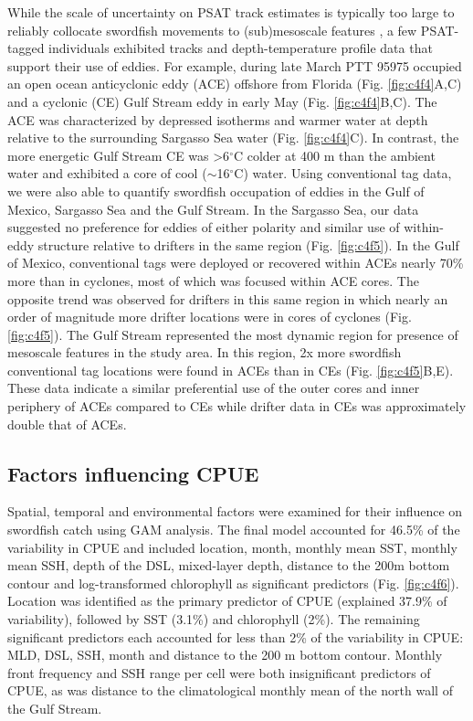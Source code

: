 While the scale of uncertainty on PSAT track estimates is typically too large to reliably collocate swordfish movements to (sub)mesoscale features \citep[$\sim$100 km;][Chp. \ref{chap:2}]{Braun2018a}, a few PSAT-tagged individuals exhibited tracks and depth-temperature profile data that support their use of eddies. For example, during late March PTT 95975 occupied an open ocean anticyclonic eddy (ACE) offshore from Florida (Fig. \ref{fig:c4f4}A,C) and a cyclonic (CE) Gulf Stream eddy in early May (Fig. \ref{fig:c4f4}B,C). The ACE was characterized by depressed isotherms and warmer water at depth relative to the surrounding Sargasso Sea water (Fig. \ref{fig:c4f4}C). In contrast, the more energetic Gulf Stream CE was >6$^{\circ}$C colder at 400 m than the ambient water and exhibited a core of cool ($\sim$16$^{\circ}$C) water. Using conventional tag data, we were also able to quantify swordfish occupation of eddies in the Gulf of Mexico, Sargasso Sea and the Gulf Stream. In the Sargasso Sea, our data suggested no preference for eddies of either polarity and similar use of within-eddy structure relative to drifters in the same region (Fig. \ref{fig:c4f5}). In the Gulf of Mexico, conventional tags were deployed or recovered within ACEs nearly 70\% more than in cyclones, most of which was focused within ACE cores. The opposite trend was observed for drifters in this same region in which nearly an order of magnitude more drifter locations were in cores of cyclones (Fig. \ref{fig:c4f5}). The Gulf Stream represented the most dynamic region for presence of mesoscale features in the study area. In this region, 2x more swordfish conventional tag locations were found in ACEs than in CEs (Fig. \ref{fig:c4f5}B,E). These data indicate a similar preferential use of the outer cores and inner periphery of ACEs compared to CEs while drifter data in CEs was approximately double that of ACEs.

\subsection{Factors influencing CPUE}

Spatial, temporal and environmental factors were examined for their influence on swordfish catch using GAM analysis. The final model accounted for 46.5\% of the variability in CPUE and included location, month, monthly mean SST, monthly mean SSH, depth of the DSL, mixed-layer depth, distance to the 200m bottom contour and log-transformed chlorophyll as significant predictors (Fig. \ref{fig:c4f6}). Location was identified as the primary predictor of CPUE (explained 37.9\% of variability), followed by SST (3.1\%) and chlorophyll (2\%). The remaining significant predictors each accounted for less than 2\% of the variability in CPUE: MLD, DSL, SSH, month and distance to the 200 m bottom contour. Monthly front frequency and SSH range per cell were both insignificant predictors of CPUE, as was distance to the climatological monthly mean of the north wall of the Gulf Stream.

